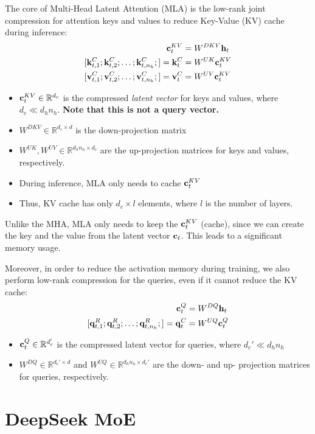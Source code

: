 The core of Multi-Head Latent Attention (MLA) is the low-rank joint compression for attention keys and values to reduce Key-Value (KV) cache during inference:
\begin{align*}
	\rvc_t^{KV} &= W^{DKV}\rvh_t\\
	[\rvk_{t,1}^C; \rvk_{t,2}^C; \dots ;\rvk_{t,n_h}^C;] = \rvk_t^{C} &= W^{UK}\rvc_t^{KV}\\
	[\rvv_{t,1}^C; \rvv_{t,2}^C; \dots ;\rvv_{t,n_h}^C;] = \rvv_t^{C} &= W^{UV}\rvc_t^{KV}
\end{align*}
\begin{itemize}
	\item ${\mathbf{c}}_t^{KV}\in \mathbb{R}^{d_c}$ is the compressed \textit{latent vector} for keys and values, where $d_c\ll d_hn_h$. \textbf{Note that this is not a query vector.}
	\item $W^{DKV}\in \mathbb{R}^{d_c\times d}$ is the down-projection matrix
	\item $W^{UK},W^{UV}\in \mathbb{R}^{d_hn_h\times d_c}$ are the up-projection matrices for keys and values, respectively.
	\item During inference, MLA only needs to cache ${\mathbf{c}}_t^{KV}$
	\item Thus, KV cache has only $d_c\times l$ elements, where $l$ is the number of layers.
\end{itemize}
Unlike the MHA, MLA only needs to keep the ${\mathbf{c}}_t^{KV}$ (\ie cache), since we can create the key and the value from the latent vector ${\mathbf{c}}_t$. This leads to a significant memory usage.

Moreover, in order to reduce the activation memory during training, we also perform low-rank compression for the queries, even if it cannot reduce the KV cache:
\begin{align*}
	\rvc_t^{Q} &= W^{DQ}\rvh_t\\
	[\rvq_{t,1}^R; \rvq_{t,2}^R; \dots ;\rvq_{t,n_h}^R;] = \rvq_t^{C} &= W^{UQ}\rvc_t^{Q}
\end{align*}
\begin{itemize}
	\item ${\mathbf{c}}_t^{Q}\in \mathbb{R}^{d_c'}$ is the compressed latent vector for queries, where $d_c'\ll d_hn_h$
	\item $W^{DQ}\in \mathbb{R}^{d_c'\times d}$ and $W^{UQ}\in \mathbb{R}^{d_hn_h\times d_c'}$ are the down- and up- projection matrices for queries, respectively.
\end{itemize}

\section{DeepSeek MoE}



